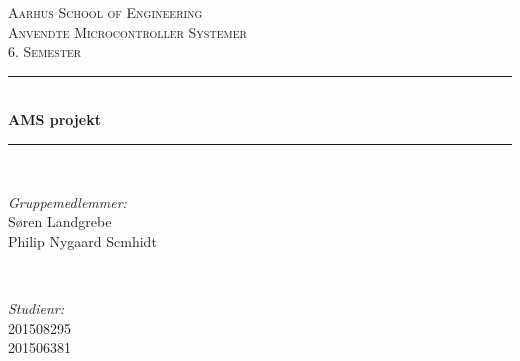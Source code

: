 \documentclass[12pt]{article}
\begin{document}
	
	\begin{titlepage}
		
		
		
		\newcommand{\HRule}{\rule{\linewidth}{0.5mm}} %
		\setlength{\topmargin}{0in}
		\centering %
		
		\textsc{\LARGE Aarhus School of Engineering}\\[1.5cm] %
		\textsc{\Large Anvendte Microcontroller Systemer}\\[0.5cm] %
		\textsc{\large 6. Semester}\\[0.5cm] %
		
		
		\HRule \\[0.4cm]
		{ \huge \bfseries AMS projekt}\\ %
		\HRule \\[1cm]
		
		
		\begin{minipage}{0.4\textwidth}
			\begin{flushleft} \large
				\emph{Gruppemedlemmer:}\\
				Søren Landgrebe \\
				Philip Nygaard Scmhidt \\
			\end{flushleft}
		\end{minipage}
		~
		\begin{minipage}{0.4\textwidth}
			\begin{flushright} \large
				\emph{Studienr:} \\
				201508295\\
				201506381\\
			\end{flushright}
		\end{minipage}\\[5cm]
		

\end{titlepage}
\end{document}
